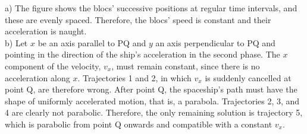%
%

\begin{center}
\vspace*{5mm}
\end{center}

a) The figure shows the blocs' successive positions at regular time intervals, and these are evenly spaced. Therefore, the blocs' speed is constant and their acceleration is naught.\\
b) Let $x$ be an axis parallel to PQ and $y$ an axis perpendicular to PQ and pointing in the direction of the ship's acceleration in the second phase. The $x$ component of the velocity, $v_x$, must remain constant, since there is no acceleration along $x$. Trajectories 1 and 2, in which $v_x$ is suddenly cancelled at point Q, are therefore wrong.
After point Q, the spaceship's path must have the shape of uniformly accelerated motion, that is, a parabola. Trajectories 2, 3, and 4 are clearly not parabolic. Therefore, the only remaining solution is trajectory 5, which is parabolic from point Q onwards and compatible with a constant $v_x$.
